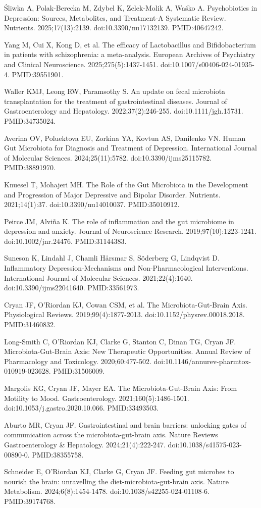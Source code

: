 \documentclass[11pt,oneside]{book}
\newcommand{\reff}[2]{\par\hangindent=7mm\hangafter=1\noindent[#1]\hspace{2mm}#2\par}
\begin{document}
\reff{47}{Śliwka A, Polak-Berecka M, Zdybel K, Zelek-Molik A, Waśko A. Psychobiotics in Depression: Sources, Metabolites, and Treatment-A Systematic Review. Nutrients. 2025;17(13):2139. doi:10.3390/nu17132139. PMID:40647242.}
\reff{48}{Yang M, Cui X, Kong D, et al. The efficacy of Lactobacillus and Bifidobacterium in patients with schizophrenia: a meta-analysis. European Archives of Psychiatry and Clinical Neuroscience. 2025;275(5):1437-1451. doi:10.1007/s00406-024-01935-4. PMID:39551901.}
\reff{49}{Waller KMJ, Leong RW, Paramsothy S. An update on fecal microbiota transplantation for the treatment of gastrointestinal diseases. Journal of Gastroenterology and Hepatology. 2022;37(2):246-255. doi:10.1111/jgh.15731. PMID:34735024.}
\reff{50}{Averina OV, Poluektova EU, Zorkina YA, Kovtun AS, Danilenko VN. Human Gut Microbiota for Diagnosis and Treatment of Depression. International Journal of Molecular Sciences. 2024;25(11):5782. doi:10.3390/ijms25115782. PMID:38891970.}
\reff{51}{Knuesel T, Mohajeri MH. The Role of the Gut Microbiota in the Development and Progression of Major Depressive and Bipolar Disorder. Nutrients. 2021;14(1):37. doi:10.3390/nu14010037. PMID:35010912.}
\reff{52}{Peirce JM, Alviña K. The role of inflammation and the gut microbiome in depression and anxiety. Journal of Neuroscience Research. 2019;97(10):1223-1241. doi:10.1002/jnr.24476. PMID:31144383.}
\reff{53}{Suneson K, Lindahl J, Chamli Hårsmar S, Söderberg G, Lindqvist D. Inflammatory Depression-Mechanisms and Non-Pharmacological Interventions. International Journal of Molecular Sciences. 2021;22(4):1640. doi:10.3390/ijms22041640. PMID:33561973.}
\reff{54}{Cryan JF, O'Riordan KJ, Cowan CSM, et al. The Microbiota-Gut-Brain Axis. Physiological Reviews. 2019;99(4):1877-2013. doi:10.1152/physrev.00018.2018. PMID:31460832.}
\reff{55}{Long-Smith C, O'Riordan KJ, Clarke G, Stanton C, Dinan TG, Cryan JF. Microbiota-Gut-Brain Axis: New Therapeutic Opportunities. Annual Review of Pharmacology and Toxicology. 2020;60:477-502. doi:10.1146/annurev-pharmtox-010919-023628. PMID:31506009.}
\reff{56}{Margolis KG, Cryan JF, Mayer EA. The Microbiota-Gut-Brain Axis: From Motility to Mood. Gastroenterology. 2021;160(5):1486-1501. doi:10.1053/j.gastro.2020.10.066. PMID:33493503.}
\reff{57}{Aburto MR, Cryan JF. Gastrointestinal and brain barriers: unlocking gates of communication across the microbiota-gut-brain axis. Nature Reviews Gastroenterology \& Hepatology. 2024;21(4):222-247. doi:10.1038/s41575-023-00890-0. PMID:38355758.}
\reff{58}{Schneider E, O'Riordan KJ, Clarke G, Cryan JF. Feeding gut microbes to nourish the brain: unravelling the diet-microbiota-gut-brain axis. Nature Metabolism. 2024;6(8):1454-1478. doi:10.1038/s42255-024-01108-6. PMID:39174768.}
\end{document}
